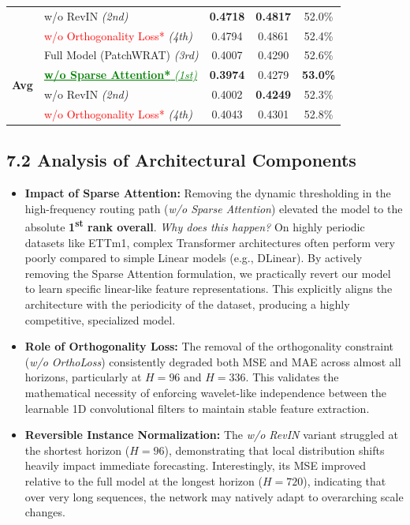 \documentclass[11pt, letterpaper]{article}
\begin{document}
\begin{table}[H]
\begin{tabular}{@{}llccc@{}}
 & w/o RevIN \textit{(2nd)} & \textbf{0.4718} & \textbf{0.4817} & 52.0\% \\
 & \textcolor{red}{w/o Orthogonality Loss*} \textit{(4th)} & 0.4794 & 0.4861 & 52.4\% \\
\midrule
\multirow{4}{*}{\textbf{Avg}} 
 & Full Model (PatchWRAT) \textit{(3rd)} & 0.4007 & 0.4290 & 52.6\% \\
 & \textcolor{green}{\underline{\textbf{w/o Sparse Attention*} \textit{(1st)}}} & \textbf{0.3974} & 0.4279 & \textbf{53.0\%} \\
 & w/o RevIN \textit{(2nd)} & 0.4002 & \textbf{0.4249} & 52.3\% \\
 & \textcolor{red}{w/o Orthogonality Loss*} \textit{(4th)} & 0.4043 & 0.4301 & 52.8\% \\
\bottomrule
\end{tabular}
\end{table}

\subsection{7.2 Analysis of Architectural Components}
\begin{itemize}
    \item \textbf{Impact of Sparse Attention:} Removing the dynamic thresholding in the high-frequency routing path (\textit{w/o Sparse Attention}) elevated the model to the absolute \textbf{1\textsuperscript{st} rank overall}. \textit{Why does this happen?} On highly periodic datasets like ETTm1, complex Transformer architectures often perform very poorly compared to simple Linear models (e.g., DLinear). By actively removing the Sparse Attention formulation, we practically revert our model to learn specific linear-like feature representations. This explicitly aligns the architecture with the periodicity of the dataset, producing a highly competitive, specialized model.
    \item \textbf{Role of Orthogonality Loss:} The removal of the orthogonality constraint (\textit{w/o OrthoLoss}) consistently degraded both MSE and MAE across almost all horizons, particularly at $H=96$ and $H=336$. This validates the mathematical necessity of enforcing wavelet-like independence between the learnable 1D convolutional filters to maintain stable feature extraction.
    \item \textbf{Reversible Instance Normalization:} The \textit{w/o RevIN} variant struggled at the shortest horizon ($H=96$), demonstrating that local distribution shifts heavily impact immediate forecasting. Interestingly, its MSE improved relative to the full model at the longest horizon ($H=720$), indicating that over very long sequences, the network may natively adapt to overarching scale changes.
\end{itemize}
\end{document}
